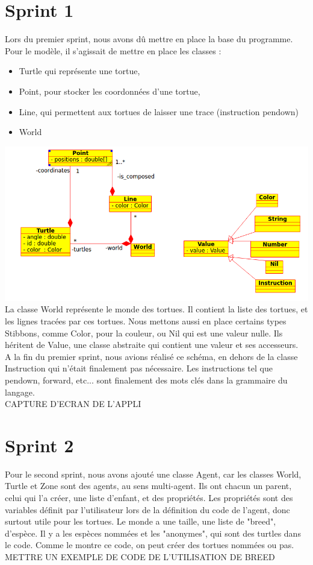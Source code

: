 \section{Sprint 1}
Lors du premier sprint, nous avons dû mettre en place la base du programme. Pour le modèle, il s'agissait de mettre en place les classes :
\begin{itemize}
\item Turtle qui représente une tortue, 
\item Point, pour stocker les coordonnées d'une tortue,
\item Line, qui permettent aux tortues de laisser une trace (instruction pendown)
\item World
\end{itemize}
\includegraphics[scale=0.5]{doc/report/uml/v01.png}
La classe World représente le monde des tortues. Il contient la liste des tortues, et les lignes tracées par ces tortues.
Nous mettons aussi en place certains types Stibbons, comme Color, pour la couleur, ou Nil qui est une valeur nulle. Ils héritent de Value, une classe abstraite qui contient une valeur et ses accesseurs.\\

A la fin du premier sprint, nous avions réalisé ce schéma, en dehors de la classe Instruction qui n'était finalement pas nécessaire. Les instructions tel que pendown, forward, etc... sont finalement des mots clés dans la grammaire du langage.\\
CAPTURE D'ECRAN DE L'APPLI

\section{Sprint 2}
Pour le second sprint, nous avons ajouté une classe Agent, car les classes World, Turtle et Zone sont des agents, au sens multi-agent. Ils ont chacun un parent, celui qui l'a créer, une liste d'enfant, et des propriétés. Les propriétés sont des variables définit par l'utilisateur lors de la définition du code de l'agent, donc surtout utile pour les tortues.
Le monde a une taille, une liste de "breed", d'espèce. Il y a les espèces nommées et les "anonymes", qui sont des turtles dans le code.
Comme le montre ce code, on peut créer des tortues nommées ou pas.\\
METTRE UN EXEMPLE DE CODE DE L'UTILISATION DE BREED\\

